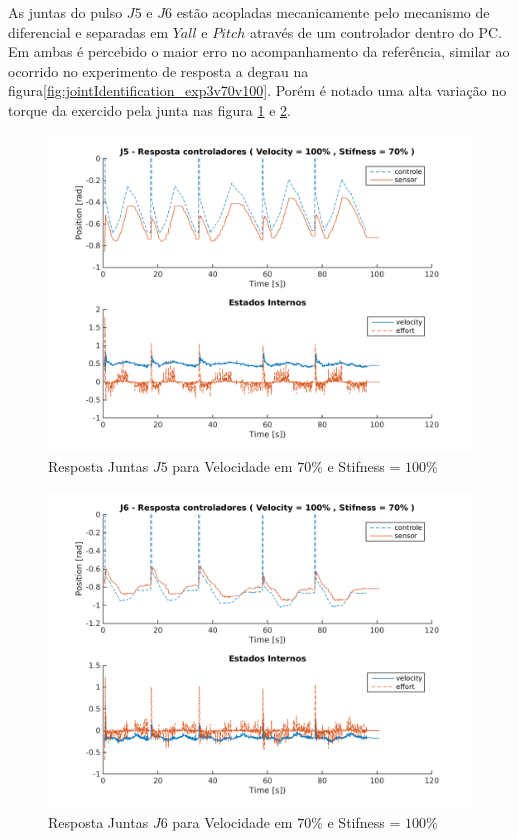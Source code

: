 As juntas do pulso $J5$ e $J6$ estão acopladas mecanicamente pelo mecanismo de diferencial e separadas em $Yall$ e $Pitch$ através de um controlador dentro do PC. Em ambas é percebido o maior erro no acompanhamento da referência, similar ao ocorrido no experimento de resposta a degrau na figura\ref{fig:jointIdentification_exp3v70v100}. Porém é notado uma alta variação no torque da exercido pela junta nas figura \ref{fig:squareStiffJ9stateEval_J5v100s70} e \ref{fig:squareStiffJ9stateEval_J6v100s70}.

\vspace{1cm}

\begin{figure}[H]
    \centering
    \includegraphics[width=0.6\linewidth,trim={2cm 1cm 2cm 2cm}]{tex/figs/squareStiffJ9stateEval_J5v100s70.png}
    \caption{Resposta Juntas $J5$ para Velocidade em $70\%$ e Stifness = $100\%$ }
    \label{fig:squareStiffJ9stateEval_J5v100s70}
\end{figure}

\vspace{1cm}

\begin{figure}[H]
    \centering
    \includegraphics[width=0.6\linewidth,trim={2cm 1cm 2cm 2cm}]{tex/figs/squareStiffJ9stateEval_J6v100s70.png}
    \caption{Resposta Juntas $J6$ para Velocidade em $70\%$ e Stifness = $100\%$ }
    \label{fig:squareStiffJ9stateEval_J6v100s70}
\end{figure}

